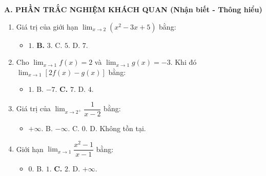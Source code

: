 \documentclass[12pt, a4paper]{article}
\begin{document}
\noindent \textbf{A. PHẦN TRẮC NGHIỆM KHÁCH QUAN (Nhận biết - Thông hiểu)}
\begin{enumerate}[leftmargin=0.6cm]
    \item Giá trị của giới hạn $\lim_{x \to 2} (x^2 - 3x + 5)$ bằng:
    \begin{itemize}[leftmargin=0.6cm]
        \item[A.] $1$. \quad \textbf{B.} $3$. \quad C. $5$. \quad D. $7$.
    \end{itemize}
    \item Cho $\lim_{x \to 1} f(x) = 2$ và $\lim_{x \to 1} g(x) = -3$. Khi đó $\lim_{x \to 1} [2f(x) - g(x)]$ bằng:
    \begin{itemize}[leftmargin=0.6cm]
        \item[A.] $1$. \quad B. $-7$. \quad \textbf{C.} $7$. \quad D. $4$.
    \end{itemize}
    \item Giá trị của $\lim_{x \to 2^+} \dfrac{1}{x - 2}$ bằng:
    \begin{itemize}[leftmargin=0.6cm]
        \item[\textbf{A.}] $+\infty$. \quad B. $-\infty$. \quad C. $0$. \quad D. Không tồn tại.
    \end{itemize}
    \item Giới hạn $\lim_{x \to 1} \dfrac{x^2 - 1}{x - 1}$ bằng:
    \begin{itemize}[leftmargin=0.6cm]
        \item[A.] $0$. \quad B. $1$. \quad \textbf{C.} $2$. \quad D. $+\infty$.
    \end{itemize}
\end{enumerate}
\end{document}
